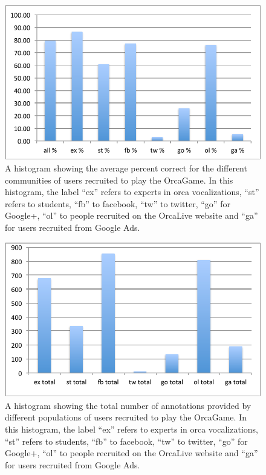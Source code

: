 \documentclass[12pt,oneside]{book}
\begin{document}
\begin{figure}[h]
\centering
\includegraphics[width=\columnwidth]{figures/orcagamePercentCorrect}
\caption{A histogram showing the average percent correct for the
  different communities of users recruited to play the OrcaGame.  In
  this histogram, the label ``ex'' refers to experts in orca
  vocalizations, ``st'' refers to students, ``fb'' to facebook, ``tw''
to twitter, ``go'' for Google+, ``ol'' to people recruited on the
OrcaLive website and ``ga'' for users recruited from Google Ads.}
\label{fig:OrcaGamePercentCorrect}
\end{figure}

\begin{figure}[h]
\centering
\includegraphics[width=\columnwidth]{figures/orcagameTotalNum}
\caption{A histogram showing the total number of annotations provided
  by different populations of users recruited to play the OrcaGame.   In
  this histogram, the label ``ex'' refers to experts in orca
  vocalizations, ``st'' refers to students, ``fb'' to facebook, ``tw''
to twitter, ``go'' for Google+, ``ol'' to people recruited on the
OrcaLive website and ``ga'' for users recruited from Google Ads.}
\label{fig:OrcaGameTotalNum}
\end{figure}
\end{document}

